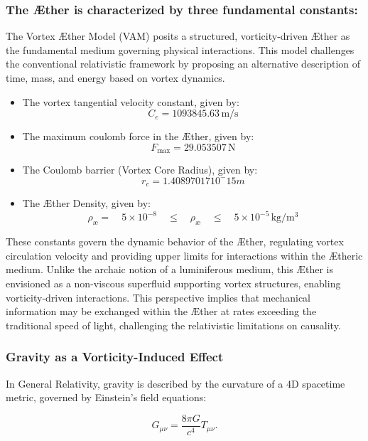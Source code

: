 \subsubsection*{The Æther is characterized by three fundamental constants:}\label{subsec:the-ae-ther-is-characterized-by-three-fundamental-constants:}

The Vortex Æther Model (VAM) posits a structured, vorticity-driven Æther as the fundamental medium governing physical interactions.
This model challenges the conventional relativistic framework by proposing an alternative description of time, mass, and energy based on vortex dynamics.

\begin{itemize}
    \item The vortex tangential velocity constant, given by: \[C_e = 1093845.63 \, \mathrm{m/s}\]
    \item The maximum coulomb force in the Æther, given by:\[F_\text{max} = 29.053507 \, \mathrm{N}\]
    \item The Coulomb barrier (Vortex Core Radius), given by: \[r_c = 1.40897017 10^-15 m\]
    \item The Æther Density, given by: \[\rho_\text{\ae} = \quad 5 \times 10^{-8} \quad \leq \quad \rho_\text{\ae} \quad \leq \quad 5 \times 10^{-5} \, \mathrm{kg/m^3}\]
\end{itemize}

These constants govern the dynamic behavior of the Æther, regulating vortex circulation velocity and providing upper limits for interactions within the Ætheric medium.
Unlike the archaic notion of a luminiferous medium, this Æther is envisioned as a non-viscous superfluid supporting vortex structures, enabling vorticity-driven interactions.
This perspective implies that mechanical information may be exchanged within the Æther at rates exceeding the traditional speed of light, challenging the relativistic limitations on causality.


    \subsubsection*{Gravity as a Vorticity-Induced Effect}

    In General Relativity, gravity is described by the curvature of a 4D spacetime metric, governed by Einstein’s field equations:

    \begin{equation*}
        G_{\mu\nu} = \frac{8\pi G}{c^4} T_{\mu\nu}.
    \end{equation*}

